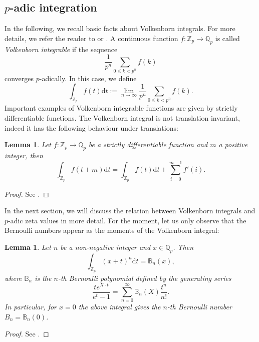 \documentclass[12pt]{article}
\newtheorem{lemma}[theorem]{Lemma}
\numberwithin{equation}{section}
\begin{document}
\subsection{$p$-adic integration}
In the following, we recall basic facts about Volkenborn integrals. For more details, we refer the reader to \cite[Chapter 5]{Rob00} or \cite[\S 55]{Sch06}. A continuous function $f\colon \mathbb{Z}_p\to \mathbb{Q}_p$ is called \emph{Volkenborn integrable} if the sequence
\[
\frac{1}{p^n}\sum_{0\leqslant k<p^n} f(k)
\]
converges $p$-adically. In this case, we define
\[
    \int_{\mathbb{Z}_p}f(t) \mathrm{d}t:= \lim_{n \to \infty} \frac{1}{p^n}\sum_{0\leqslant k<p^n} f(k).
\]
Important examples of Volkenborn integrable functions are given by strictly differentiable functions. The Volkenborn integral is not translation invariant, indeed it has the following behaviour under translations:
\begin{lemma}\label{lem:Volkenborn_translation}
    Let $f\colon\mathbb{Z}_p\to \mathbb{Q}_p$ be a strictly differentiable function and $m$ a positive integer, then
    \[
    \int_{\mathbb{Z}_p} f(t+m)\mathrm{d}t= \int_{\mathbb{Z}_p} f(t)\mathrm{d}t+\sum_{i=0}^{m-1}f'(i).
    \]
\end{lemma}
\begin{proof}
    See \cite[\S 5.3, Prop. 2]{Rob00}.
\end{proof}
In the next section, we will discuss the relation between Volkenborn integrals and $p$-adic zeta values in more detail. For the moment, let us only observe that the Bernoulli numbers appear as the moments of the Volkenborn integral:
\begin{lemma}\label{lem:Volkenborn_Bernoulli}
Let $n$ be a non-negative integer and $x\in \mathbb{Q}_p$. Then
\[
    \int_{\mathbb{Z}_p} (x+t)^n \mathrm{d}t= \mathbb{B}_n(x),
\]
where $\mathbb{B}_n$ is the $n$-th Bernoulli polynomial defined by the generating series
\[
    \frac{te^{X\cdot t}}{e^t-1}=\sum_{n=0}^\infty \mathbb{B}_n(X)\frac{t^n}{n!}.
\]
In particular, for $x=0$ the above integral gives the $n$-th Bernoulli number $B_n=\mathbb{B}_n(0)$.
\end{lemma}
\begin{proof}
See \cite[Ch. 5, \S 5.4]{Rob00}.
\end{proof}
\end{document}
